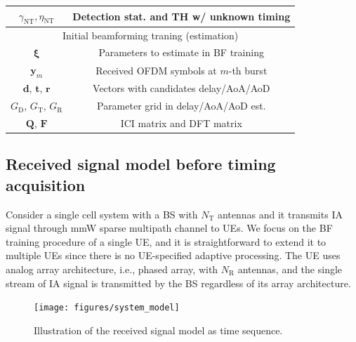 \documentclass[journal]{IEEEtran}
\newcommand{\tx}[0]{\text{T}}
\newcommand{\rx}[0]{\text{R}}
\newcommand{\Gr}[0]{G_{\text{R}}}
\newcommand{\Gt}[0]{G_{\text{T}}}
\newcommand{\Gd}[0]{G_{\text{D}}}
\begin{document}
\begin{table}
\begin{tabular}{|c|c|}
$\gamma_{\text{NT}}, \eta_{\text{NT}}$ & Detection stat. and TH w/ unknown timing\tabularnewline
\hline 
\multicolumn{2}{|c|}{Initial beamforming traning (estimation)}\tabularnewline
\hline
$\boldsymbol{\xi}$ & Parameters to estimate in BF training \tabularnewline
$\mathbf{y}_m$  & Received OFDM symbols at $m$-th burst \tabularnewline
$\mathbf{d}$, $\mathbf{t}$, $\mathbf{r}$ & Vectors with candidates delay/AoA/AoD \tabularnewline
$\Gd$, $\Gt$, $\Gr$ & Parameter grid in delay/AoA/AoD est. \tabularnewline
$\mathbf{Q}$, $\mathbf{F}$ & ICI matrix and DFT matrix \tabularnewline

\hline
\end{tabular}
\label{tab:notation}
\end{table}


%
%
\subsection{Received signal model before timing acquisition}
\label{sec:signal_model_before_timing}
Consider a single cell system with a BS with $N_{\tx}$ antennas and it transmits IA signal through mmW sparse multipath channel to UEs. We focus on the BF training procedure of a single UE, and it is straightforward to extend it to multiple UEs since there is no UE-specified adaptive processing. The UE uses analog array architecture, i.e., phased array, with $N_{\rx}$ antennas, and the single stream of IA signal is transmitted by the BS regardless of its array architecture.
\begin{figure}
\begin{center}
\texttt{[image: figures/system\_model]}
\end{center}
\vspace{-5mm}
\caption{Illustration of the received signal model as time sequence.}
\vspace{-5mm}
\label{fig:system_mode}
\end{figure}
\end{document}
